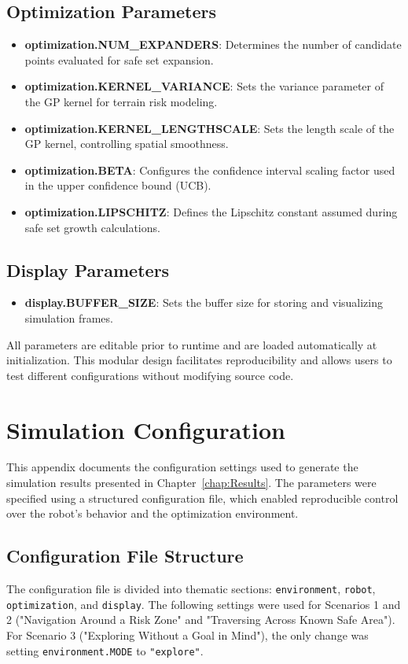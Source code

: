 \begin{appendices}
\section*{Optimization Parameters}
\begin{itemize}
    \item \textbf{optimization.NUM\_EXPANDERS}: Determines the number of candidate points evaluated for safe set expansion.
    \item \textbf{optimization.KERNEL\_VARIANCE}: Sets the variance parameter of the GP kernel for terrain risk modeling.
    \item \textbf{optimization.KERNEL\_LENGTHSCALE}: Sets the length scale of the GP kernel, controlling spatial smoothness.
    \item \textbf{optimization.BETA}: Configures the confidence interval scaling factor used in the upper confidence bound (UCB).
    \item \textbf{optimization.LIPSCHITZ}: Defines the Lipschitz constant assumed during safe set growth calculations.
\end{itemize}

\section*{Display Parameters}
\begin{itemize}
    \item \textbf{display.BUFFER\_SIZE}: Sets the buffer size for storing and visualizing simulation frames.
\end{itemize}

All parameters are editable prior to runtime and are loaded automatically at initialization. This modular design facilitates reproducibility and allows users to test different configurations without modifying source code.

\chapter{Simulation Configuration}
\label{appendix:config}

This appendix documents the configuration settings used to generate the simulation results presented in Chapter~\ref{chap:Results}. The parameters were specified using a structured configuration file, which enabled reproducible control over the robot's behavior and the optimization environment.

\section*{Configuration File Structure}
The configuration file is divided into thematic sections: \texttt{environment}, \texttt{robot}, \texttt{optimization}, and \texttt{display}. The following settings were used for Scenarios 1 and 2 ("Navigation Around a Risk Zone" and "Traversing Across Known Safe Area"). For Scenario 3 ("Exploring Without a Goal in Mind"), the only change was setting \texttt{environment.MODE} to \texttt{"explore"}.



\end{appendices}
